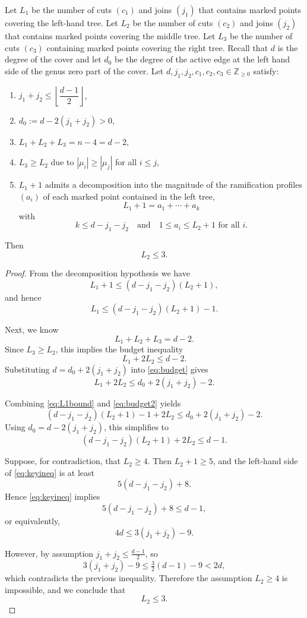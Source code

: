 \documentclass[10pt,a4paper]{amsart}
\begin{document}
\begin{lemma}\label{lemma:max3cutsandjoins}
Let $L_1$ be the number of cuts $(c_1)$ and joins $(j_1)$ that contains marked points covering the left-hand tree. Let $L_2$ be the number of cuts $(c_2)$ and joins $(j_2)$ that contains marked points covering the middle tree. Let $L_3$ be the number of cuts $(c_3)$ containing marked points covering the right tree. Recall that $d$ is the degree of the cover and let $d_0$ be the degree of the active edge at the left hand side of the genus zero part of the cover. 
Let $d,j_1,j_2,c_1,c_2,c_3 \in \mathbb{Z}_{\ge 0}$ satisfy:
\begin{enumerate}
  \item $j_1+j_2 \le \left\lfloor \dfrac{d-1}{2}\right\rfloor$,
  \item $d_0 := d-2(j_1+j_2) > 0$,
  \item $L_1 + L_2 + L_3 = n-4=d-2$, 
  \item $L_3 \ge L_2$ due to $|\mu_i|\geq|\mu_j|$ for all $i\leq j$,
  \item $L_1+1$ admits a decomposition into the magnitude of the ramification profiles $(a_i)$ of each marked point contained in the left tree,
  \[
  L_1 + 1 = a_1 + \cdots + a_k
  \]
  with
  \[
  k \le d-j_1-j_2
  \quad\text{and}\quad
  1 \le a_i \le L_2+1 \text{ for all } i.
  \] 
\end{enumerate}
Then
\[
L_2 \le 3.
\]
\end{lemma}

\begin{proof}
From the decomposition hypothesis we have
\[
L_1+1 \le (d-j_1-j_2)(L_2+1),
\]
and hence
\begin{equation}
\label{eq:L1bound}
L_1 \le (d-j_1-j_2)(L_2+1)-1.
\end{equation}

Next, we know
\[
L_1+L_2+L_3=d-2.
\]
Since $L_3\ge L_2$, this implies the budget inequality
\begin{equation}
\label{eq:budget}
L_1+2L_2 \le d-2.
\end{equation}
Substituting $d=d_0+2(j_1+j_2)$ into \eqref{eq:budget} gives
\begin{equation}
\label{eq:budget2}
L_1+2L_2 \le d_0+2(j_1+j_2)-2.
\end{equation}

Combining \eqref{eq:L1bound} and \eqref{eq:budget2} yields
\[
(d-j_1-j_2)(L_2+1)-1+2L_2
\le d_0+2(j_1+j_2)-2.
\]
Using $d_0=d-2(j_1+j_2)$, this simplifies to
\begin{equation}
\label{eq:keyineq}
(d-j_1-j_2)(L_2+1)+2L_2 \le d-1.
\end{equation}

Suppose, for contradiction, that $L_2\ge 4$. Then $L_2+1\ge 5$, and the
left-hand side of \eqref{eq:keyineq} is at least
\[
5(d-j_1-j_2)+8.
\]
Hence \eqref{eq:keyineq} implies
\[
5(d-j_1-j_2)+8 \le d-1,
\]
or equivalently,
\[
4d \le 3(j_1+j_2)-9.
\]

However, by assumption $j_1+j_2 \le \frac{d-1}{2}$, so
\[
3(j_1+j_2)-9 \le \tfrac{3}{2}(d-1)-9 < 2d,
\]
which contradicts the previous inequality. Therefore the assumption
$L_2\ge 4$ is impossible, and we conclude that
\[
L_2 \le 3.
\]
\end{proof}
\end{document}
